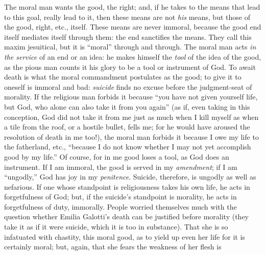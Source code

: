 The moral man wants the good, the right; and, if he takes to the means that 
lead to this goal, really lead to it, then these means are not \textit{his} 
means, but those of the good, right, etc., itself. These means are never 
immoral, because the good end itself mediates itself through them: the end 
sanctifies the means. They call this maxim jesuitical, but it is ``moral'' 
through and through. The moral man acts \textit{in the service} of an end or 
an idea: he makes himself the \textit{tool} of the idea of the good, as the 
pious man counts it his glory to be a tool or instrument of God. To await 
death is what the moral commandment postulates as the good; to give it to 
oneself is immoral and bad: \textit{suicide} finds no excuse before the 
judgment-seat of morality. If the religious man forbids it because ``you have 
not given yourself life, but God, who alone can also take it from you again'' 
(as if, even taking in this conception, God did not take it from me just as 
much when I kill myself as when a tile from the roof, or a hostile bullet, 
fells me; for he would have aroused the resolution of death in me too!), the 
moral man forbids it because I owe my life to the fatherland, etc., ``because 
I do not know whether I may not yet accomplish good by my life.'' Of course, 
for in me good loses a tool, as God does an instrument. If I am immoral, the 
good is served in my \textit{amendment}; if I am ``ungodly,'' God has joy in 
my \textit{penitence}. Suicide, therefore, is ungodly as well as nefarious. If 
one whose standpoint is religiousness takes his own life, he acts in 
forgetfulness of God; but, if the suicide's standpoint is morality, he acts in 
forgetfulness of duty, immorally. People worried themselves much with the 
question whether Emilia Galotti's death can be justified before morality (they 
take it as if it were suicide, which it is too in substance). That she is so 
infatuated with chastity, this moral good, as to yield up even her life for it 
is certainly moral; but, again, that she fears the weakness of her flesh is 
